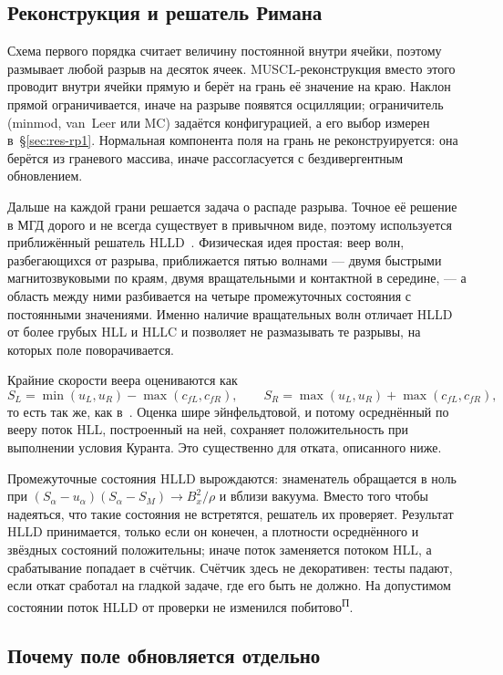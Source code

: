 \documentclass[12pt,a4paper]{article}
\newcommand{\Pv}{\textsuperscript{\scriptsize П}}   %
\begin{document}
\subsection{Реконструкция и решатель Римана}
\label{sec:hlld}

Схема первого порядка считает величину постоянной внутри ячейки, поэтому размывает
любой разрыв на десяток ячеек. MUSCL-реконструкция вместо этого проводит внутри
ячейки прямую и берёт на грань её значение на краю. Наклон прямой ограничивается,
иначе на разрыве появятся осцилляции; ограничитель (minmod, van~Leer или MC)
задаётся конфигурацией, а его выбор измерен в~\S\ref{sec:res-rp1}. Нормальная
компонента поля на грань не реконструируется: она берётся из граневого массива,
иначе рассогласуется с бездивергентным обновлением.

Дальше на каждой грани решается задача о распаде разрыва. Точное её решение в МГД
дорого и не всегда существует в привычном виде, поэтому используется приближённый
решатель HLLD~\cite{miyoshi2005}. Физическая идея простая: веер волн,
разбегающихся от разрыва, приближается пятью волнами — двумя быстрыми
магнитозвуковыми по краям, двумя вращательными и контактной в середине, — а
область между ними разбивается на четыре промежуточных состояния с постоянными
значениями. Именно наличие вращательных волн отличает HLLD от более грубых HLL и
HLLC и позволяет не размазывать те разрывы, на которых поле поворачивается.

Крайние скорости веера оцениваются как
\[
 S_L=\min(u_L,u_R)-\max(c_{fL},c_{fR}),\qquad
 S_R=\max(u_L,u_R)+\max(c_{fL},c_{fR}),
\]
то есть так же, как в~\cite{avdeeva2019}. Оценка шире эйнфельдтовой, и потому
осреднённый по вееру поток HLL, построенный на ней, сохраняет положительность при
выполнении условия Куранта. Это существенно для отката, описанного ниже.

Промежуточные состояния HLLD вырождаются: знаменатель обращается в ноль при
$(S_\alpha-u_\alpha)(S_\alpha-S_M)\to B_x^2/\rho$ и вблизи вакуума. Вместо того
чтобы надеяться, что такие состояния не встретятся, решатель их проверяет.
Результат HLLD принимается, только если он конечен, а плотности осреднённого и
звёздных состояний положительны; иначе поток заменяется потоком HLL, а
срабатывание попадает в счётчик. Счётчик здесь не декоративен: тесты падают, если
откат сработал на гладкой задаче, где его быть не должно. На допустимом состоянии
поток HLLD от проверки не изменился побитово\Pv.

\subsection{Почему поле обновляется отдельно}
\label{sec:ct}
\end{document}
